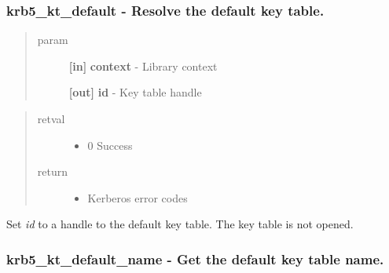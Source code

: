 \documentclass[letterpaper,10pt,english]{sphinxmanual}
\begin{document}
\subsubsection{krb5\_kt\_default -  Resolve the default key table.}
\label{appdev/refs/api/krb5_kt_default:krb5-kt-default-resolve-the-default-key-table}\label{appdev/refs/api/krb5_kt_default::doc}

\begin{fulllineitems}
\label{appdev/refs/api/krb5_kt_default:krb5_kt_default}
\end{fulllineitems}

\begin{quote}\begin{description}
\item[{param}] \leavevmode
\textbf{{[}in{]}} \textbf{context} - Library context

\textbf{{[}out{]}} \textbf{id} - Key table handle

\end{description}\end{quote}
\begin{quote}\begin{description}
\item[{retval}] \leavevmode\begin{itemize}
\item {} 
0   Success

\end{itemize}

\item[{return}] \leavevmode\begin{itemize}
\item {} 
Kerberos error codes

\end{itemize}

\end{description}\end{quote}

Set \emph{id} to a handle to the default key table. The key table is not opened.


\subsubsection{krb5\_kt\_default\_name -  Get the default key table name.}
\label{appdev/refs/api/krb5_kt_default_name::doc}\label{appdev/refs/api/krb5_kt_default_name:krb5-kt-default-name-get-the-default-key-table-name}
\end{document}
